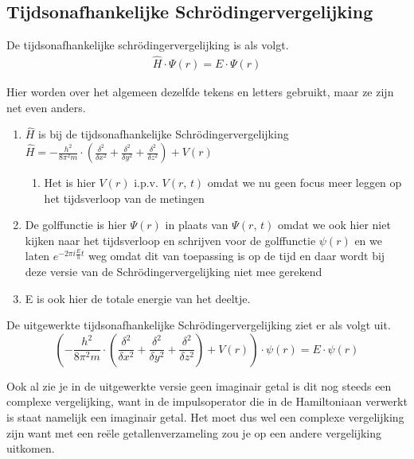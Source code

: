 \documentclass[11pt,fleqn]{book} %
\begin{document}
\subsection{Tijdsonafhankelijke Schrödingervergelijking}
\begin{definition}
De tijdsonafhankelijke schrödingervergelijking is als volgt.
\begin{align*}
\hat{H}\cdot \Psi(r)=E\cdot \Psi(r)
\end{align*}
\end{definition}

Hier worden over het algemeen dezelfde tekens en letters gebruikt, maar ze zijn net even anders.
\begin{enumerate}
\item $\hat{H}$ is bij de tijdsonafhankelijke Schrödingervergelijking $\hat{H}=-\frac{h^2}{8\pi^2m}\cdot \left(\frac{\delta^2}{\delta x^2}+\frac{\delta^2}{\delta y^2}+\frac{\delta^2}{\delta z^2}\right)+V(r)$
\begin{enumerate}
\item Het is hier $V(r)$ i.p.v. $V(r,\,t)$ omdat we nu geen focus meer leggen op het tijdsverloop van de metingen
\end{enumerate}
\item De golffunctie is hier $\Psi(r)$ in plaats van $\Psi(r,\,t)$ omdat we ook hier niet kijken naar het tijdsverloop en schrijven voor de golffunctie $\psi(r)$ en we laten $e^{-2\pi i\frac{E}{h}t}$ weg omdat dit van toepassing is op de tijd en daar wordt bij deze versie van de Schrödingervergelijking niet mee gerekend
\item E is ook hier de totale energie van het deeltje.
\end{enumerate}

De uitgewerkte tijdsonafhankelijke Schrödingervergelijking ziet er als volgt uit.
\begin{displaymath}
\left(-\frac{h^2}{8\pi^2m}\cdot \left(\frac{\delta^2}{\delta x^2}+\frac{\delta^2}{\delta y^2}+\frac{\delta^2}{\delta z^2}\right)+V(r)\right)\cdot \psi(r)=E\cdot \psi(r)
\end{displaymath}

Ook al zie je in de uitgewerkte versie geen imaginair getal is dit nog steeds een complexe vergelijking, want in de impulsoperator die in de Hamiltoniaan verwerkt is staat namelijk een imaginair getal. Het moet dus wel een complexe vergelijking zijn want met een reële getallenverzameling zou je op een andere vergelijking uitkomen.
\end{document}
